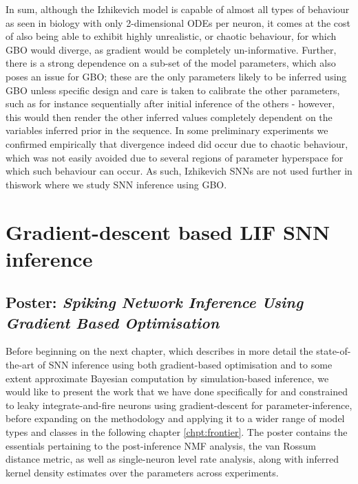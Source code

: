 \documentclass[mphil,deptreport,ianc]{infthesis} %
\begin{document}
In sum, although the Izhikevich model is capable of almost all types of behaviour as seen in biology with only 2-dimensional ODEs per neuron, it comes at the cost of also being able to exhibit highly unrealistic, or chaotic behaviour, for which GBO would diverge, as gradient would be completely un-informative.
Further, there is a strong dependence on a sub-set of the model parameters, which also poses an issue for GBO; these are the only parameters likely to be inferred using GBO unless specific design and care is taken to calibrate the other parameters, such as for instance sequentially after initial inference of the others - however, this would then render the other inferred values completely dependent on the variables inferred prior in the sequence. 
In some preliminary experiments we confirmed empirically that divergence indeed did occur due to chaotic behaviour, which was not easily avoided due to several regions of parameter hyperspace for which such behaviour can occur. 
As such, Izhikevich SNNs are not used further in thiswork where we study SNN inference using GBO.


\chapter{Gradient-descent based LIF SNN inference}\label{chpt:LIF}

\section{Poster: \textit{Spiking Network Inference Using Gradient Based Optimisation}}

Before beginning on the next chapter, which describes in more detail the state-of-the-art of SNN inference using both gradient-based optimisation and to some extent approximate Bayesian computation by simulation-based inference, we would like to present the work that we have done specifically for and constrained to leaky integrate-and-fire neurons using gradient-descent for parameter-inference, before expanding on the methodology and applying it to a wider range of model types and classes in the following chapter \ref{chpt:frontier}.
The poster contains the essentials pertaining to the post-inference NMF analysis, the van Rossum distance metric, as well as single-neuron level rate analysis, along with inferred kernel density estimates over the parameters across experiments.
\end{document}
